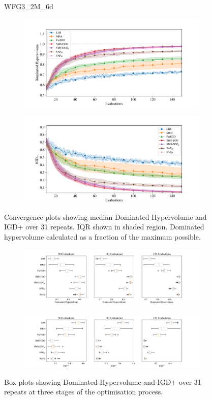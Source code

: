 \documentclass[conference]{IEEEtran}
\begin{document}
\begin{figure}
WFG3\_2M\_6d


\begin{subfigure}[hbt!]{\linewidth}

    \centering
    \includegraphics[width=0.7\linewidth]{figures/wfg3_2obj_6dim_hv_plot.pdf}
\end{subfigure}
\begin{subfigure}[h]{\linewidth}
    \centering
    \includegraphics[width=0.7\linewidth]{figures/wfg3_2obj_6dim_igd_plot.pdf}
\end{subfigure}
    \caption{Convergence plots showing median Dominated Hypervolume and IGD+ over 31 repeats. IQR shown in shaded region. Dominated hypervolume calculated as a fraction of the maximum possible.}
\vspace{\floatsep}
\begin{subfigure}[t]{\linewidth}
    \centering
    \includegraphics[width=0.8\linewidth]{figures/wfg3_2obj_6dim_hv_boxplot.pdf}
\end{subfigure}
\begin{subfigure}[t]{\linewidth}
    \centering
    \includegraphics[width=0.8\linewidth]{figures/wfg3_2obj_6dim_igd_boxplot.pdf}
\end{subfigure}
    \caption{Box plots showing Dominated Hypervolume and IGD+ over 31 repeats at three stages of the optimisation process.}
\end{figure}
\clearpage
\end{document}
